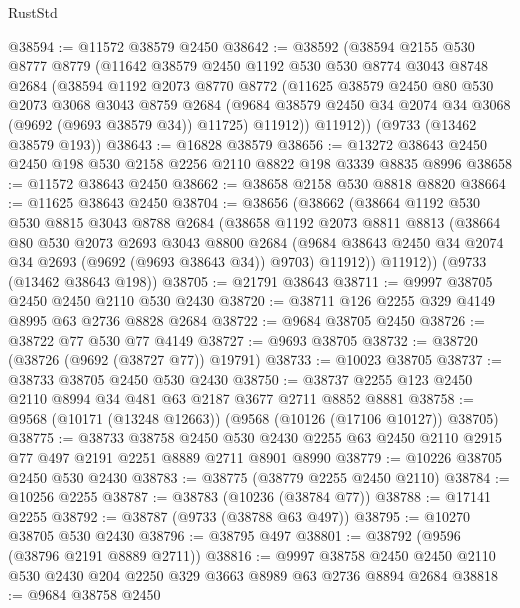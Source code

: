 \begin{lexlean}{RustStd}
\begin{coremodule}
{\begin{coremodule}
{{{{{{{{{{{{{{{{{{{{{{{{{{{{{{{{{{{{{{{{{{{{{{{{{{{{{{{@38594 := @11572 @38579 @2450
@38642 := @38592
    (@38594
      @2155
      @530
      @8777
      @8779
      (@11642
        @38579
        @2450
        @1192
        @530
        @530
        @8774
        @3043
        @8748
        @2684
        (@38594
          @1192
          @2073
          @8770
          @8772
          (@11625
            @38579
            @2450
            @80
            @530
            @2073
            @3068
            @3043
            @8759
            @2684
            (@9684 @38579 @2450 @34 @2074 @34 @3068 (@9692 (@9693 @38579 @34)) @11725)
            @11912))
        @11912))
    (@9733 (@13462 @38579 @193))
@38643 := @16828 @38579
@38656 := @13272 @38643 @2450 @2450 @198 @530 @2158 @2256 @2110 @8822 @198 @3339 @8835 @8996
@38658 := @11572 @38643 @2450
@38662 := @38658 @2158 @530 @8818 @8820
@38664 := @11625 @38643 @2450
@38704 := @38656
    (@38662
      (@38664
        @1192
        @530
        @530
        @8815
        @3043
        @8788
        @2684
        (@38658
          @1192
          @2073
          @8811
          @8813
          (@38664
            @80
            @530
            @2073
            @2693
            @3043
            @8800
            @2684
            (@9684 @38643 @2450 @34 @2074 @34 @2693 (@9692 (@9693 @38643 @34)) @9703)
            @11912))
        @11912))
    (@9733 (@13462 @38643 @198))
@38705 := @21791 @38643
@38711 := @9997 @38705 @2450 @2450 @2110 @530 @2430
@38720 := @38711 @126 @2255 @329 @4149 @8995 @63 @2736 @8828 @2684
@38722 := @9684 @38705 @2450
@38726 := @38722 @77 @530 @77 @4149
@38727 := @9693 @38705
@38732 := @38720 (@38726 (@9692 (@38727 @77)) @19791)
@38733 := @10023 @38705
@38737 := @38733 @38705 @2450 @530 @2430
@38750 := @38737 @2255 @123 @2450 @2110 @8994 @34 @481 @63 @2187 @3677 @2711 @8852 @8881
@38758 := @9568 (@10171 (@13248 @12663)) (@9568 (@10126 (@17106 @10127)) @38705)
@38775 := @38733
    @38758
    @2450
    @530
    @2430
    @2255
    @63
    @2450
    @2110
    @2915
    @77
    @497
    @2191
    @2251
    @8889
    @2711
    @8901
    @8990
@38779 := @10226 @38705 @2450 @530 @2430
@38783 := @38775 (@38779 @2255 @2450 @2110)
@38784 := @10256 @2255
@38787 := @38783 (@10236 (@38784 @77))
@38788 := @17141 @2255
@38792 := @38787 (@9733 (@38788 @63 @497))
@38795 := @10270 @38705 @530 @2430
@38796 := @38795 @497
@38801 := @38792 (@9596 (@38796 @2191 @8889 @2711))
@38816 := @9997
    @38758
    @2450
    @2450
    @2110
    @530
    @2430
    @204
    @2250
    @329
    @3663
    @8989
    @63
    @2736
    @8894
    @2684
@38818 := @9684 @38758 @2450
}}}}}}}}}}}}}}}}}}}}}}}}}}}}}}}}}}}}}}}}}}}}}}}}}}}}}}}
\end{coremodule}}
\end{coremodule}
\end{lexlean}
